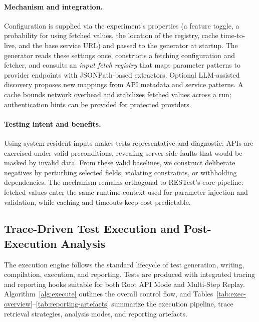 \documentclass[conference]{IEEEtran}
\begin{document}
\paragraph{Mechanism and integration.}
Configuration is supplied via the experiment’s properties (a feature toggle, a probability for using fetched values, the location of the registry, cache time-to-live, and the base service URL) and passed to the generator at startup. The generator reads these settings once, constructs a fetching configuration and fetcher, and consults an \emph{input fetch registry} that maps parameter patterns to provider endpoints with JSONPath-based extractors. Optional LLM-assisted discovery proposes new mappings from API metadata and service patterns. A cache bounds network overhead and stabilizes fetched values across a run; authentication hints can be provided for protected providers.


\paragraph{Testing intent and benefits.}
Using system-resident inputs makes tests representative and diagnostic: APIs are exercised under valid preconditions, revealing server-side faults that would be masked by invalid data. From these valid baselines, we construct deliberate negatives by perturbing selected fields, violating constraints, or withholding dependencies. The mechanism remains orthogonal to RESTest’s core pipeline: fetched values enter the same runtime context used for parameter injection and validation, while caching and timeouts keep cost predictable.


\subsection{Trace-Driven Test Execution and Post-Execution Analysis}
\label{ssec:exec}

The execution engine follows the standard lifecycle of test generation, writing, compilation, execution, and reporting. Tests are produced with integrated tracing and reporting hooks suitable for both Root API Mode and Multi-Step Replay. Algorithm~\ref{alg:execute} outlines the overall control flow, and Tables~\ref{tab:exec-overview}--\ref{tab:reporting-artefacts} summarize the execution pipeline, trace retrieval strategies, analysis modes, and reporting artefacts.
\end{document}

